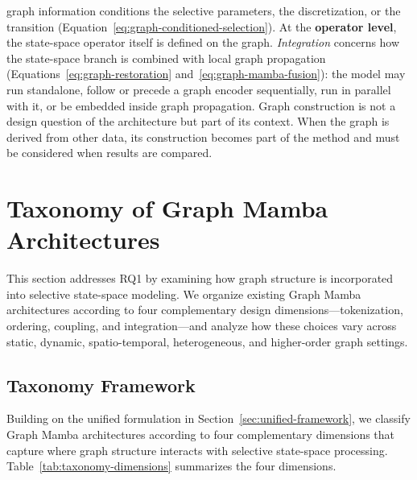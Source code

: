 \documentclass[acmsmall]{acmart}
\begin{document}
graph information conditions the selective parameters, the discretization, or
the transition (Equation~\eqref{eq:graph-conditioned-selection}). At the
\textbf{operator level}, the state-space operator itself is defined on the
graph. \emph{Integration} concerns how the state-space branch is combined with
local graph propagation (Equations~\eqref{eq:graph-restoration}
and~\eqref{eq:graph-mamba-fusion}): the model may run standalone, follow or
precede a graph encoder sequentially, run in parallel with it, or be embedded
inside graph propagation.
Graph construction is not a design
question of the architecture but part of its context. When the graph is
derived from other data, its construction becomes part of the method and must
be considered when results are compared.



\section{Taxonomy of Graph Mamba Architectures}
\label{sec:taxonomy}
This section addresses RQ1 by examining how graph structure is incorporated into selective state-space modeling. We organize existing Graph Mamba architectures according to four complementary design dimensions—tokenization, ordering, coupling, and integration—and analyze how these choices vary across static, dynamic, spatio-temporal, heterogeneous, and higher-order graph settings.

\subsection{Taxonomy Framework}
\label{subsec:taxonomy-dimensions}

Building on the unified formulation in
Section~\ref{sec:unified-framework}, we classify Graph Mamba architectures
according to four complementary dimensions that capture where graph structure
interacts with selective state-space processing. 
Table~\ref{tab:taxonomy-dimensions} summarizes the four dimensions.%
\end{document}
